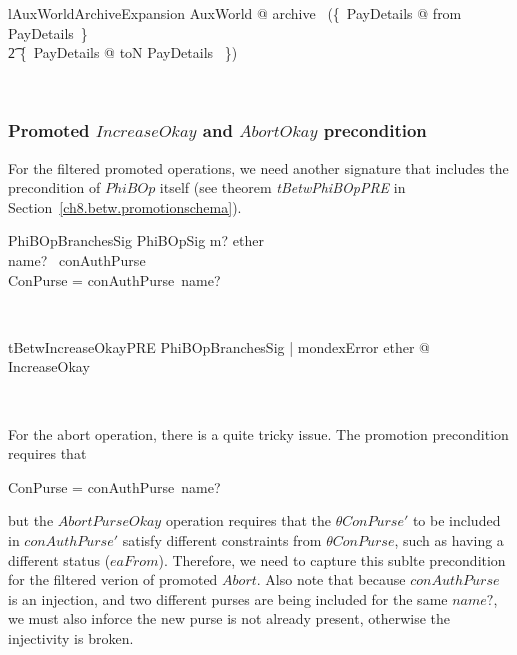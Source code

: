 \begin{LNewLemma}
\begin{theorem}{lAuxWorldArchiveExpansion}
    \forall AuxWorld @ archive \in \power~(\{~PayDetails @ from \mapsto \theta PayDetails~\} \cup \\
      \t2 \{~PayDetails @ toN \mapsto \theta PayDetails ~\})
\end{theorem}~\end{LNewLemma}


\subsubsection{Promoted $IncreaseOkay$  and $AbortOkay$ precondition}\label{ch8.betw.promotionschema.branches}

For the filtered promoted operations, we need another signature that includes the
precondition of $PhiBOp$ itself (see theorem \textit{tBetwPhiBOpPRE} in Section~\ref{ch8.betw.promotionschema}).
%
\begin{LNewSDef}
\begin{schema}{PhiBOpBranchesSig}
   PhiBOpSig
\where
   m? \in ether \\
   name? \in \dom~conAuthPurse \\
   \theta ConPurse = conAuthPurse~name?
\end{schema}~\end{LNewSDef}

\begin{LNewThm}
\begin{theorem}{tBetwIncreaseOkayPRE}
   \forall PhiBOpBranchesSig | mondexError \in ether @ \pre IncreaseOkay
\end{theorem}~\end{LNewThm}

For the abort operation, there is a quite tricky issue.
The promotion precondition requires that
%
\begin{gzed}
    \theta ConPurse = conAuthPurse~name?
\end{gzed}
%
but the $AbortPurseOkay$ operation requires that the $\theta ConPurse'$
to be included in $conAuthPurse'$ satisfy different constraints from
$\theta ConPurse$, such as having a different status ($eaFrom$).
Therefore, we need to capture this sublte precondition for the
filtered verion of promoted $Abort$.
Also note that because $conAuthPurse$ is an injection, and two different purses
are being included for the same $name?$, we must also inforce the new purse is
not already present, otherwise the injectivity is broken.

